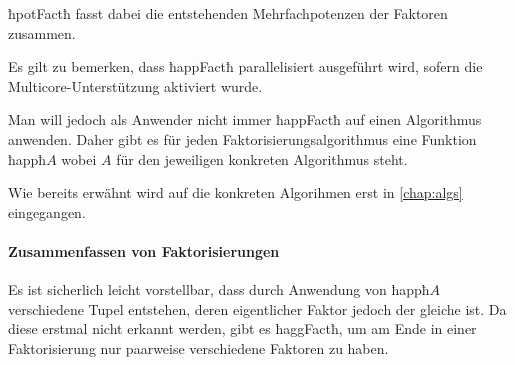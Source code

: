 
ħpotFactħ fasst dabei die entstehenden Mehrfachpotenzen der Faktoren zusammen.


Es gilt zu bemerken, dass ħappFactħ parallelisiert ausgeführt wird, sofern die
Multicore-Unterstützung aktiviert wurde.

Man will jedoch als Anwender nicht immer ħappFactħ auf einen Algorithmus
anwenden. Daher gibt es für jeden Faktorisierungsalgorithmus eine Funktion 
ħappħ$A$ wobei $A$ für den jeweiligen konkreten Algorithmus steht.



Wie bereits erwähnt wird auf die konkreten Algorihmen erst in
\autoref{chap:algs} eingegangen.

\paragraph{Zusammenfassen von Faktorisierungen} Es ist sicherlich leicht
vorstellbar, dass durch Anwendung von ħappħ$A$ verschiedene Tupel entstehen,
deren eigentlicher Faktor jedoch der gleiche ist. Da diese erstmal nicht
erkannt werden, gibt es ħaggFactħ, um am Ende in einer Faktorisierung nur
paarweise verschiedene Faktoren zu haben.


